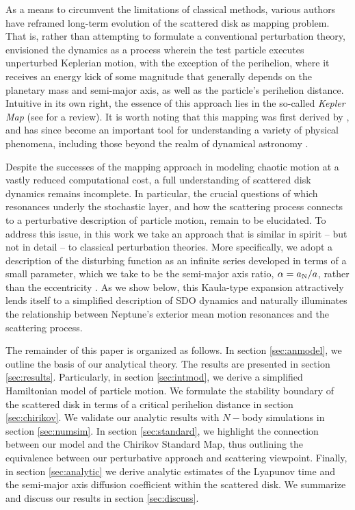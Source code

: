 \documentclass[twocolumn]{aastex62}
\newcommand{\an}{a_{\rm{N}}}
\begin{document}
As a means to circumvent the limitations of classical methods, various authors have reframed long-term evolution of the scattered disk as mapping problem. That is, rather than attempting to formulate a conventional perturbation theory, \citet{Malyshkin1999, 2004AJ....128.1418P, 2013Icar..222...20F, 2020PASP..132l4401K} envisioned the dynamics as a process wherein the test particle executes unperturbed Keplerian motion, with the exception of the perihelion, where it receives an energy kick of some magnitude that generally depends on the planetary mass and semi-major axis, as well as the particle's perihelion distance. Intuitive in its own right, the essence of this approach lies in the so-called \textit{Kepler Map} (see \citealt{2011NewA...16...94S} for a review). It is worth noting that this mapping was first derived by \citet{1986PhLA..117..328P}, and has since become an important tool for understanding a variety of physical phenomena, including those beyond the realm of dynamical astronomy \citep{Chirikov1989, 1987JPhB...20.5051G, 1988IJQE...24.1420C, 1988JPhB...21L.527J, 1994PhRvA..50..575S, 1998PhLA..241...53S}.

Despite the successes of the mapping approach in modeling chaotic motion at a vastly reduced computational cost, a full understanding of scattered disk dynamics remains incomplete. In particular, the crucial questions of which resonances underly the stochastic layer, and how the scattering process connects to a perturbative description of particle motion, remain to be elucidated. To address this issue, in this work we take an approach that is similar in spirit -- but not in detail -- to classical perturbation theories. More specifically, we adopt a description of the disturbing function as an infinite series developed in terms of a small parameter, which we take to be the semi-major axis ratio, $\alpha=\an/a$, rather than the eccentricity \citep{1962AJ.....67..300K,Laskar2010DISTFUNCT, 2013MNRAS.435.2187M}. As we show below, this Kaula-type expansion attractively lends itself to a simplified description of SDO dynamics and naturally illuminates the relationship between Neptune's exterior mean motion resonances and the scattering process.

The remainder of this paper is organized as follows. In section \ref{sec:anmodel}, we outline the basis of our analytical theory. The results are presented in section \ref{sec:results}. Particularly, in section \ref{sec:intmod}, we derive a simplified Hamiltonian model of particle motion. We formulate the stability boundary of the scattered disk in terms of a critical perihelion distance in section \ref{sec:chirikov}. We validate our analytic results with $N-$body simulations in section \ref{sec:numsim}. In section \ref{sec:standard}, we highlight the connection between our model and the Chirikov Standard Map, thus outlining the equivalence between our perturbative approach and scattering viewpoint. Finally, in section \ref{sec:analytic} we derive analytic estimates of the Lyapunov time and the semi-major axis diffusion coefficient within the scattered disk. We summarize and discuss our results in section \ref{sec:discuss}.
\end{document}
